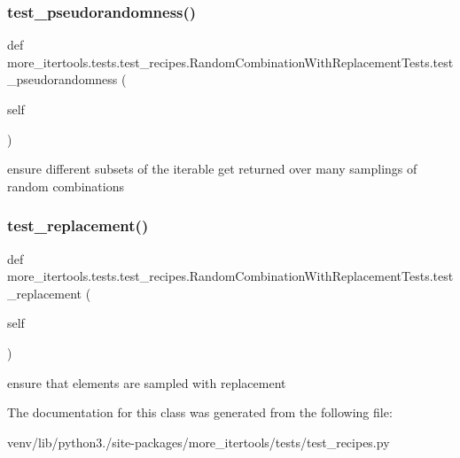 \subsubsection{\texorpdfstring{test\+\_\+pseudorandomness()}{test\_pseudorandomness()}}
{\footnotesize\ttfamily def more\+\_\+itertools.\+tests.\+test\+\_\+recipes.\+Random\+Combination\+With\+Replacement\+Tests.\+test\+\_\+pseudorandomness (\begin{DoxyParamCaption}\item[{}]{self }\end{DoxyParamCaption})}

\begin{DoxyVerb}ensure different subsets of the iterable get returned over many
samplings of random combinations\end{DoxyVerb}
 \mbox{\label{classmore__itertools_1_1tests_1_1test__recipes_1_1_random_combination_with_replacement_tests_a6ec1cfa188b2e8773d56a41bcfe12b02}} 
\subsubsection{\texorpdfstring{test\+\_\+replacement()}{test\_replacement()}}
{\footnotesize\ttfamily def more\+\_\+itertools.\+tests.\+test\+\_\+recipes.\+Random\+Combination\+With\+Replacement\+Tests.\+test\+\_\+replacement (\begin{DoxyParamCaption}\item[{}]{self }\end{DoxyParamCaption})}

\begin{DoxyVerb}ensure that elements are sampled with replacement\end{DoxyVerb}
 

The documentation for this class was generated from the following file\+:\begin{DoxyCompactItemize}
\item 
venv/lib/python3./site-\/packages/more\+\_\+itertools/tests/test\+\_\+recipes.\+py\end{DoxyCompactItemize}
